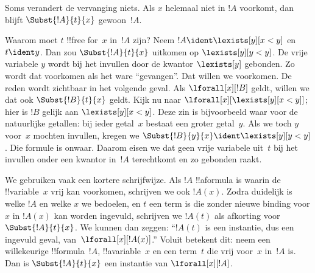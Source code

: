 \documentclass[../../../include/open-logic-section]{subfiles}
\begin{document}
\begin{explain}
Soms verandert de vervanging niets. Als $x$ helemaal niet in $!A$
voorkomt, dan blijft $\Subst{!A}{t}{x}$ gewoon~$!A$.

Waarom moet $t$ !!{free for}~$x$ in~$!A$ zijn? Neem
$!A \ident \lexists[y][x < y]$ en $t \ident y$. Dan zou
$\Subst{!A}{t}{x}$ uitkomen op $\lexists[y][y < y]$. De vrije variabele
$y$ wordt bij het invullen door de kwantor $\lexists[y]$ gebonden. Zo
wordt dat voorkomen als het ware ``gevangen''. Dat willen we voorkomen.
De reden wordt zichtbaar in het volgende geval. Als
$\lforall[x][!B]$ geldt, willen we dat ook $\Subst{!B}{t}{x}$ geldt.
Kijk nu naar $\lforall[x][\lexists[y][x < y]]$; hier is $!B$ gelijk
aan $\lexists[y][x < y]$. Deze zin is bijvoorbeeld waar voor de
natuurlijke getallen: bij ieder getal~$x$ bestaat een groter getal~$y$.
Als we toch $y$ voor~$x$ mochten invullen, kregen we
$\Subst{!B}{y}{x} \ident \lexists[y][y < y]$. Die formule is onwaar.
Daarom eisen we dat geen vrije variabele uit~$t$ bij het invullen onder
een kwantor in~$!A$ terechtkomt en zo gebonden raakt.
\end{explain}

We gebruiken vaak een kortere schrijfwijze. Als $!A$ !!a{formula} is
waarin de !!{variable}~$x$ vrij kan voorkomen, schrijven we ook
$!A(x)$. Zodra duidelijk is welke $!A$ en welke $x$ we bedoelen, en
$t$ een term is die zonder nieuwe binding voor $x$ in $!A(x)$ kan
worden ingevuld, schrijven we $!A(t)$ als afkorting voor
$\Subst{!A}{t}{x}$.
We kunnen dan zeggen: ``$!A(t)$ is een instantie, dus een ingevuld
geval, van~$\lforall[x][!A(x)]$.'' Voluit betekent dit: neem een
willekeurige !!{formula}~$!A$, !!a{variable}~$x$ en een term~$t$ die
vrij voor~$x$ in~$!A$ is. Dan is $\Subst{!A}{t}{x}$ een instantie van
$\lforall[x][!A]$.
\end{document}
